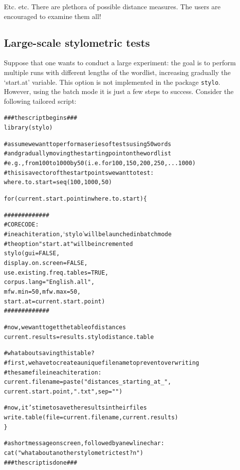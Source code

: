 \documentclass[11pt,a4paper]{article}
\def\code#1{{\tt #1}}
\begin{document}
Etc. etc. There are plethora of possible distance measures. The users are 
encouraged to examine them all!

\subsection{Large-scale stylometric tests}


Suppose that one wants to conduct a large experiment: the goal is to perform multiple runs with different lengths of the wordlist, increasing gradually the `start.at' variable. This option is not implemented in the package \code{stylo}. However, using the batch mode it is just a few steps to success. Consider the following tailored script:

\begin{alltt}
### the script begins ###
library(stylo)

# assume we want to perform a series of tests using 50 words
# and gradually moving the starting point on the wordlist
# e.g., from 100 to 1000 by 50 (i.e. for 100, 150, 200, 250, ... 1000)
# this is a vector of the start points we want to test:
where.to.start = seq(100,1000,50)

for(current.start.point in where.to.start) \{ 

    #############
    # CORE CODE:
    # in each iteration, `stylo' will be launched in batch mode
    # the option "start.at" will be incremented
    stylo(gui = FALSE,
          display.on.screen = FALSE,
          use.existing.freq.tables = TRUE,
          corpus.lang = "English.all",
          mfw.min = 50, mfw.max = 50,
          start.at = current.start.point) 
    #############

  # now, we want to get the table of distances
  current.results = results.stylodistance.table

  # what about saving this table?
  # first, we have to create a unique file name to prevent overwriting
  # the same file in each iteration:
  current.filename = paste("distances_starting_at_",
                       current.start.point, ".txt", sep="")
                       
  # now, it's time to save the results in their files
  write.table(file = current.filename, current.results)
\}

# a short message on screen, followed by a newline char:
cat("what about another stylometric test?n")
### the script is done ###
\end{alltt}
\end{document}
